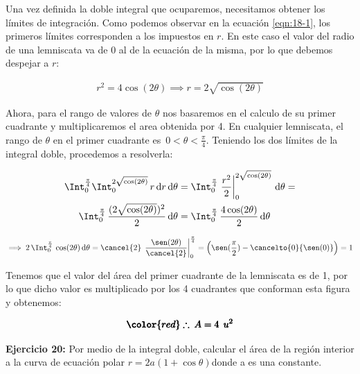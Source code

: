 \documentclass[12pt]{article}
\begin{document}
\noindent Una vez definida la doble integral que ocuparemos, necesitamos obtener los límites de integración. Como podemos observar en la ecuación \eqref{eqn:18-1}, los primeros límites corresponden a los impuestos en $r$. En este caso el valor del radio de una lemniscata va de $0$ al de la ecuación de la misma, por lo que debemos despejar a $r$:

\begin{align*}
	r^2 = 4\cos(2\theta) \implies r = 2\sqrt{\cos(2\theta)}
\end{align*}

\noindent Ahora, para el rango de valores de $\theta$ nos basaremos en el calculo de su primer cuadrante y multiplicaremos el area obtenida por 4. En cualquier lemniscata, el rango de $\theta$ en el primer cuadrante es $\,0<\theta<\frac{\pi}{4}$. Teniendo los dos límites de la integral doble, procedemos a resolverla:

\begin{align*}
	\Int_{0}^{\frac{\pi}{4}} \Int_{0}^{2\sqrt{\cos(2\theta)}}\, r\,\mathrm{d}r\,\mathrm{d}\theta &= \Int_{0}^{\frac{\pi}{4}} \left.\frac{r^2}{2}\right|_{0}^{2\sqrt{\cos(2\theta)}}\,\mathrm{d}\theta = \\ \Int_{0}^{\frac{\pi}{4}}\,\frac{(2\sqrt{\cos(2\theta)})^2}{2}\,\mathrm{d}\theta &= \Int_{0}^{\frac{\pi}{4}}\, \frac{4\cos(2\theta)}{2}\,\mathrm{d}\theta
\end{align*}

\begin{align*}
	\implies 2\,\Int_{0}^{\frac{\pi}{4}}\, \cos(2\theta)\,\mathrm{d}\theta = \cancel{2}\,\left.\frac{\sen(2\theta)}{\cancel{2}}\right|_{0}^{\frac{\pi}{4}} = \left(\sen(\frac{\pi}{2}) - \cancelto{0}{\sen(0)}\right) = 1
\end{align*}

\noindent Tenemos que el valor del área del primer cuadrante de la lemniscata es de 1, por lo que dicho valor es multiplicado por los 4 cuadrantes que conforman esta figura y obtenemos:

\begin{align*}
	\pmb{\color{red} \therefore\: A = 4\: \: u^2}
\end{align*}

\noindent \textbf{Ejercicio 20:} Por medio de la integral doble, calcular el área de la región interior a la curva de
ecuación polar $r = 2a(1 + \cos \theta)$donde a es una constante.

\vspace{5mm}
\end{document}
